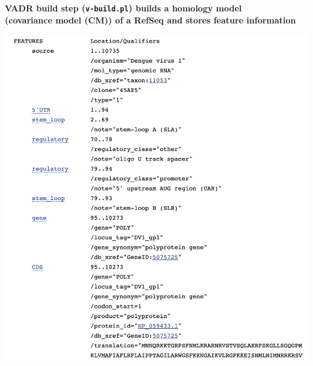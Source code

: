 \documentclass[landscape]{slides}
\begin{document}
\begin{slide}
\begin{center}
\textbf{VADR build step (\texttt{v-build.pl}) builds a homology model
  \\ (covariance model (CM)) of a RefSeq and stores feature information}

\includegraphics[width=6in]{figs/ss-001477-mid}

\end{center}
\vfill
\end{slide}
\end{document}

